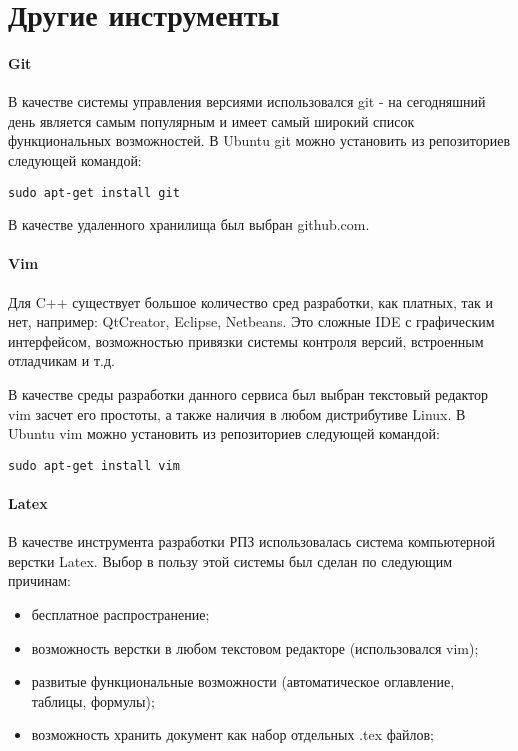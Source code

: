 \section{Другие инструменты}
\paragraph{Git}

В качестве системы управления версиями использовался git - на сегодняшний день является самым популярным и имеет самый широкий список функциональных возможностей. В Ubuntu git можно установить из репозиториев следующей командой:
\begin{lstlisting}
sudo apt-get install git
\end{lstlisting}

В качестве удаленного хранилища был выбран github.com.

\paragraph{Vim}

Для C++ существует большое количество сред разработки, как платных, так и нет, например: QtCreator, Eclipse, Netbeans. Это сложные IDE с графическим интерфейсом, возможностью привязки системы контроля версий, встроенным отладчикам и т.д.

В качестве среды разработки данного сервиса был выбран текстовый редактор vim засчет его простоты, а также наличия в любом дистрибутиве Linux. В Ubuntu vim можно установить из репозиториев следующей командой:
\begin{lstlisting}
sudo apt-get install vim
\end{lstlisting}

\paragraph{Latex}

В качестве инструмента разработки РПЗ использовалась система компьютерной верстки Latex. Выбор в пользу этой системы был сделан по следующим причинам:
\begin{itemize}
\item бесплатное распространение;
\item возможность верстки в любом текстовом редакторе (использовался vim);
\item развитые функциональные возможности (автоматическое оглавление, таблицы, формулы);
\item возможность хранить документ как набор отдельных .tex файлов;
\end{itemize}

